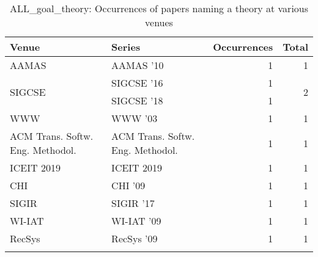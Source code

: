 \begin{table*}[t]
\begin{tabular}{llrr}
Venue & Series & Occurrences & Total\\\hline
\multirow{1}{*}{AAMAS } & AAMAS '10 & 1 & \multirow{1}{*}{1}\\
\multirow{2}{*}{SIGCSE } & SIGCSE '16 & 1 & \multirow{2}{*}{2}\\
& SIGCSE '18 & 1 &\\
\multirow{1}{*}{WWW } & WWW '03 & 1 & \multirow{1}{*}{1}\\
\multirow{1}{*}{ACM Trans. Softw. Eng. Methodol.} & ACM Trans. Softw. Eng. Methodol. & 1 & \multirow{1}{*}{1}\\
\multirow{1}{*}{ICEIT 2019} & ICEIT 2019 & 1 & \multirow{1}{*}{1}\\
\multirow{1}{*}{CHI } & CHI '09 & 1 & \multirow{1}{*}{1}\\
\multirow{1}{*}{SIGIR } & SIGIR '17 & 1 & \multirow{1}{*}{1}\\
\multirow{1}{*}{WI-IAT } & WI-IAT '09 & 1 & \multirow{1}{*}{1}\\
\multirow{1}{*}{RecSys } & RecSys '09 & 1 & \multirow{1}{*}{1}\\
\caption{ALL_goal_theory: Occurrences of papers naming a theory at various venues}
\end{tabular}
\end{table*}